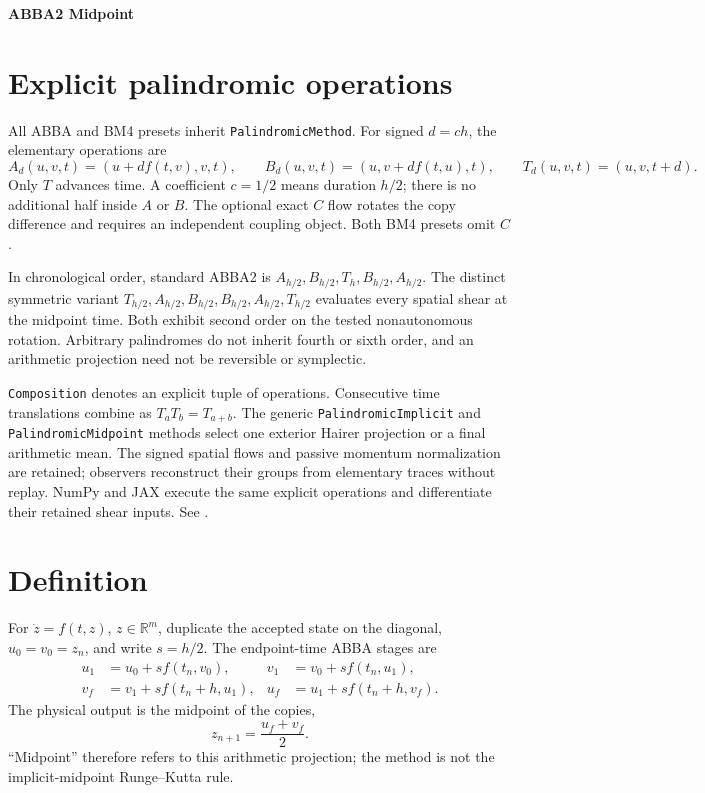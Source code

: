 \documentclass[11pt,a4paper]{article}
\newcommand{\R}{\mathbb{R}}
\begin{document}
\begin{center}
 {\LARGE\bfseries\color{gcblue}ABBA2 Midpoint}\par
 \vspace{0.35em}{\large Explicit duplicated-space step with arithmetic projection}
\end{center}

\section*{Explicit palindromic operations}
All ABBA and BM4 presets inherit \texttt{PalindromicMethod}. For signed
$d=c h$, the elementary operations are
\[
 A_d(u,v,t)=(u+d f(t,v),v,t),\qquad
 B_d(u,v,t)=(u,v+d f(t,u),t),\qquad
 T_d(u,v,t)=(u,v,t+d).
\]
Only $T$ advances time. A coefficient $c=1/2$ means duration $h/2$;
there is no additional half inside $A$ or $B$. The optional exact $C$ flow
rotates the copy difference and requires an independent coupling object.
Both BM4 presets omit $C$.

In chronological order, standard ABBA2 is
$A_{h/2},B_{h/2},T_h,B_{h/2},A_{h/2}$.
The distinct symmetric variant
$T_{h/2},A_{h/2},B_{h/2},B_{h/2},A_{h/2},T_{h/2}$
evaluates every spatial shear at the midpoint time. Both exhibit second
order on the tested nonautonomous rotation. Arbitrary palindromes do not
inherit fourth or sixth order, and an arithmetic projection need not be
reversible or symplectic.

\texttt{Composition} denotes an explicit tuple of operations.
Consecutive time translations combine as $T_a T_b=T_{a+b}$.
The generic \texttt{PalindromicImplicit} and \texttt{PalindromicMidpoint}
methods select one exterior Hairer projection or a final arithmetic mean.
The signed spatial flows and passive momentum normalization are retained;
observers reconstruct their groups from elementary traces without replay. NumPy and JAX execute the same
explicit operations and differentiate their retained shear inputs.
See .


\section{Definition}

For $\dot z=f(t,z)$, $z\in\R^m$, duplicate the accepted state on the diagonal,
$u_0=v_0=z_n$, and write $s=h/2$.  The endpoint-time ABBA stages are
\begin{align}
u_1&=u_0+s f(t_n,v_0),&
v_1&=v_0+s f(t_n,u_1),\\
v_f&=v_1+s f(t_n+h,u_1),&
u_f&=u_1+s f(t_n+h,v_f).
\end{align}
The physical output is the midpoint of the copies,
\[
z_{n+1}=\frac{u_f+v_f}{2}.
\]
``Midpoint'' therefore refers to this arithmetic projection; the method is not
the implicit-midpoint Runge--Kutta rule.
\end{document}
